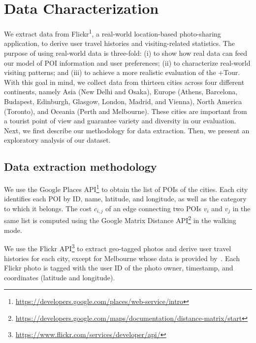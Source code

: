 \color{black}
\section{Data Characterization}\label{sec:data-characterization}

We extract data from Flickr\textsuperscript 1, a real-world location-based photo-sharing application, to derive user travel histories and visiting-related statistics. The purpose of using real-world data is three-fold: (i) to show how real data can feed our model of POI information and user preferences; (ii) to characterize real-world visiting patterns; and (iii) to achieve a more realistic evaluation of the +Tour. With this goal in mind, we collect data from thirteen cities across four different continents, namely Asia (New Delhi and Osaka), Europe (Athens, Barcelona, Budapest, Edinburgh, Glasgow, London, Madrid, and Vienna), North America (Toronto), and Oceania (Perth and Melbourne). These cities are important from a tourist point of view and guarantee variety and diversity in our evaluation. Next, we first describe our methodology for data extraction. Then, we present an exploratory analysis of our dataset.

\subsection{Data extraction methodology}
\label{sec:data-1}

We use the Google Places API\footnote{\url{https://developers.google.com/places/web-service/intro}} to obtain the list of POIs of the cities. Each city identifies each POI by ID, name, latitude, and longitude, as well as the category to which it belongs. The cost $c_{i,j}$ of an edge connecting two POIs $v_i$ and $v_j$ in the same list is computed using the Google Matrix Distance API\footnote{\url{https://developers.google.com/maps/documentation/distance-matrix/start}} in the walking mode.

We use the Flickr API\footnote{\url{https://www.flickr.com/services/developer/api/}} to extract geo-tagged photos and derive user travel histories for each city, except for Melbourne whose data is provided by~\cite{MelbourneDataSet}. Each Flickr photo is tagged with the user ID of the photo owner, timestamp, and coordinates (latitude and longitude).

